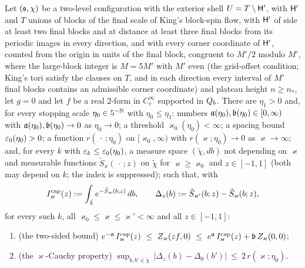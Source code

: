 \begin{theorem}\label{rot:hyp:HS}
Let $(\mathfrak s,\chi)$ be a two-level configuration with the exterior shell $U=T\setminus\mathsf H'$, with $\mathsf H'$ and $T$ unions of blocks of the final scale of King's block-spin flow, with $\mathsf H'$ of side at least two final blocks and at distance at least three final blocks from its periodic images in every direction, and with every corner coordinate of $\mathsf H'$, counted from the origin in units of the final block, congruent to $M'/2$ modulo $M'$, where the large-block integer is $M=5M'$ with $M'$ even (the grid-offset condition; King's tori satisfy the clauses on $T$, and in each direction every interval of $M'$ final blocks contains an admissible corner coordinate) and plateau height $n\ge n_*$, let $g=0$ and let $f$ be a real $2$-form in $C^\infty_c$ supported in $Q_{b}$. There are $\eta_1>0$ and, for every stopping scale $\eta_0\in5^{-\mathbb N}$ with $\eta_0\le\eta_1$: numbers $\mathfrak a(\eta_0),\mathfrak b(\eta_0)\in[0,\infty)$ with $\mathfrak a(\eta_0),\mathfrak b(\eta_0)\to0$ as $\eta_0\to0$; a threshold $\varkappa_0(\eta_0)<\infty$; a spacing bound $\varepsilon_0(\eta_0)>0$; a function $r(\,\cdot\,;\eta_0)$ on $[\varkappa_0,\infty)$ with $r(\varkappa;\eta_0)\to0$ as $\varkappa\to\infty$; and, for every $k$ with $\varepsilon_k\le\varepsilon_0(\eta_0)$, a measure space $(\tilde\chi,db)$ not depending on $\varkappa$ and measurable functions $\tilde S_\varkappa(\,\cdot\,;z)$ on $\tilde\chi$ for $\varkappa\ge\varkappa_0$ and $z\in[-1,1]$ (both may depend on $k$; the index is suppressed); such that, with
\[
I^{\mathrm{cap}}_\varkappa(z):=\int_{\tilde\chi}e^{-\tilde S_\varkappa(b;z)}\,db ,\qquad
\Delta_z(b):=\tilde S_{\varkappa'}(b;z)-\tilde S_\varkappa(b;z),
\]
for every such $k$, all $\varkappa_0\le\varkappa\le\varkappa'<\infty$ and all $z\in[-1,1]$:
\begin{enumerate}[label=\textup{(\roman*)},leftmargin=*]
\item \textup{(the two-sided bound)} $e^{-\sfa}\,\Icap_\varkappa(z)\ \le\ Z_\varkappa(zf,0)\ \le\ e^{\sfa}\,\Icap_\varkappa(z)+\sfb\,Z_\varkappa(0,0)$;
\item \textup{(the $\varkappa$-Cauchy property)} $\sup_{b,b'\in\tilde\chi}\,|\Delta_z(b)-\Delta_0(b')|\ \le\ 2\,r(\varkappa;\eta_0)$.
\end{enumerate}
\end{theorem}



